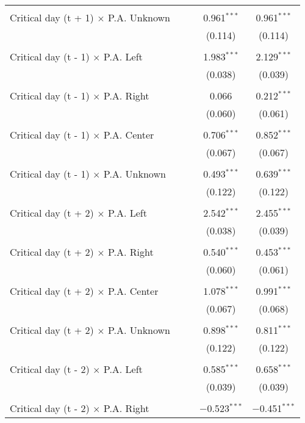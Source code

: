 \documentclass[
]{article}
\begin{document}
\begin{table}[!htbp]
{\begin{tabular}{@{\extracolsep{5pt}}lcccc}
  & & & & \\ 
 Critical day (t + 1) $\times$ P.A. Unknown &  &  & 0.961$^{***}$ & 0.961$^{***}$ \\ 
  &  &  & (0.114) & (0.114) \\ 
  & & & & \\ 
 Critical day (t - 1) $\times$ P.A. Left &  &  & 1.983$^{***}$ & 2.129$^{***}$ \\ 
  &  &  & (0.038) & (0.039) \\ 
  & & & & \\ 
 Critical day (t - 1) $\times$ P.A. Right &  &  & 0.066 & 0.212$^{***}$ \\ 
  &  &  & (0.060) & (0.061) \\ 
  & & & & \\ 
 Critical day (t - 1) $\times$ P.A. Center &  &  & 0.706$^{***}$ & 0.852$^{***}$ \\ 
  &  &  & (0.067) & (0.067) \\ 
  & & & & \\ 
 Critical day (t - 1) $\times$ P.A. Unknown &  &  & 0.493$^{***}$ & 0.639$^{***}$ \\ 
  &  &  & (0.122) & (0.122) \\ 
  & & & & \\ 
 Critical day (t + 2) $\times$ P.A. Left &  &  & 2.542$^{***}$ & 2.455$^{***}$ \\ 
  &  &  & (0.038) & (0.039) \\ 
  & & & & \\ 
 Critical day (t + 2) $\times$ P.A. Right &  &  & 0.540$^{***}$ & 0.453$^{***}$ \\ 
  &  &  & (0.060) & (0.061) \\ 
  & & & & \\ 
 Critical day (t + 2) $\times$ P.A. Center &  &  & 1.078$^{***}$ & 0.991$^{***}$ \\ 
  &  &  & (0.067) & (0.068) \\ 
  & & & & \\ 
 Critical day (t + 2) $\times$ P.A. Unknown &  &  & 0.898$^{***}$ & 0.811$^{***}$ \\ 
  &  &  & (0.122) & (0.122) \\ 
  & & & & \\ 
 Critical day (t - 2) $\times$ P.A. Left &  &  & 0.585$^{***}$ & 0.658$^{***}$ \\ 
  &  &  & (0.039) & (0.039) \\ 
  & & & & \\ 
 Critical day (t - 2) $\times$ P.A. Right &  &  & $-$0.523$^{***}$ & $-$0.451$^{***}$ \\ 

\end{tabular}}
\end{table}
\end{document}
